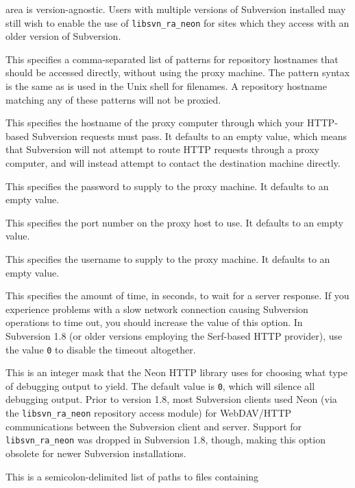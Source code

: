 \begin{description}
area is version-agnostic. Users with multiple versions of Subversion
installed may still wish to enable the use of \texttt{libsvn\_ra\_neon}
for sites which they access with an older version of Subversion.
\item[\texttt{http-proxy-exceptions}]
This specifies a comma-separated list of patterns for repository
hostnames that should be accessed directly, without using the proxy
machine. The pattern syntax is the same as is used in the Unix shell for
filenames. A repository hostname matching any of these patterns will not
be proxied.
\item[\texttt{http-proxy-host}]
This specifies the hostname of the proxy computer through which your
HTTP-based Subversion requests must pass. It defaults to an empty value,
which means that Subversion will not attempt to route HTTP requests
through a proxy computer, and will instead attempt to contact the
destination machine directly.
\item[\texttt{http-proxy-password}]
This specifies the password to supply to the proxy machine. It defaults
to an empty value.
\item[\texttt{http-proxy-port}]
This specifies the port number on the proxy host to use. It defaults to
an empty value.
\item[\texttt{http-proxy-username}]
This specifies the username to supply to the proxy machine. It defaults
to an empty value.
\item[\texttt{http-timeout}]
This specifies the amount of time, in seconds, to wait for a server
response. If you experience problems with a slow network connection
causing Subversion operations to time out, you should increase the value
of this option. In Subversion 1.8 (or older versions employing the
Serf-based HTTP provider), use the value \texttt{0} to disable the
timeout altogether.
\item[\texttt{neon-debug-mask}]
This is an integer mask that the Neon HTTP library uses for choosing
what type of debugging output to yield. The default value is \texttt{0},
which will silence all debugging output. Prior to version 1.8, most
Subversion clients used Neon (via the \texttt{libsvn\_ra\_neon}
repository access module) for WebDAV/HTTP communications between the
Subversion client and server. Support for \texttt{libsvn\_ra\_neon} was
dropped in Subversion 1.8, though, making this option obsolete for newer
Subversion installations.
\item[\texttt{ssl-authority-files}]
This is a semicolon-delimited list of paths to files containing

\end{description}
